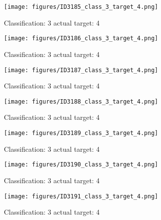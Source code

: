 \begin{figure}[h!]
\begin{center}
\texttt{[image: figures/ID3185\_class\_3\_target\_4.png]}
\end{center}
\caption{ Classification: 3 actual target: 4}
\label{fig:ID3185_class_3_target_4}
\end{figure}
\begin{figure}[h!]
\begin{center}
\texttt{[image: figures/ID3186\_class\_3\_target\_4.png]}
\end{center}
\caption{ Classification: 3 actual target: 4}
\label{fig:ID3186_class_3_target_4}
\end{figure}
\begin{figure}[h!]
\begin{center}
\texttt{[image: figures/ID3187\_class\_3\_target\_4.png]}
\end{center}
\caption{ Classification: 3 actual target: 4}
\label{fig:ID3187_class_3_target_4}
\end{figure}
\begin{figure}[h!]
\begin{center}
\texttt{[image: figures/ID3188\_class\_3\_target\_4.png]}
\end{center}
\caption{ Classification: 3 actual target: 4}
\label{fig:ID3188_class_3_target_4}
\end{figure}
\begin{figure}[h!]
\begin{center}
\texttt{[image: figures/ID3189\_class\_3\_target\_4.png]}
\end{center}
\caption{ Classification: 3 actual target: 4}
\label{fig:ID3189_class_3_target_4}
\end{figure}
\begin{figure}[h!]
\begin{center}
\texttt{[image: figures/ID3190\_class\_3\_target\_4.png]}
\end{center}
\caption{ Classification: 3 actual target: 4}
\label{fig:ID3190_class_3_target_4}
\end{figure}
\begin{figure}[h!]
\begin{center}
\texttt{[image: figures/ID3191\_class\_3\_target\_4.png]}
\end{center}
\caption{ Classification: 3 actual target: 4}
\label{fig:ID3191_class_3_target_4}
\end{figure}
